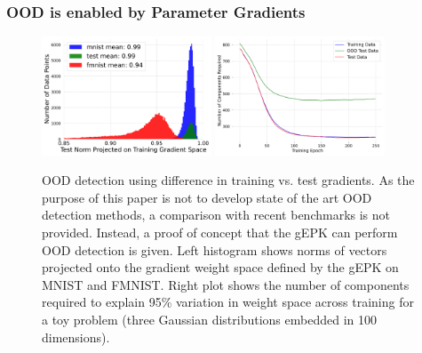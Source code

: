 \begin{frame}
  \frametitle{OOD is enabled by Parameter Gradients}

\begin{figure}[h]
\begin{center}
\includegraphics[width=0.45\textwidth]{c4a_figures/grad_alignment_hist.pdf}
\includegraphics[width=0.45\textwidth]{c4a_figures/ood_noise.pdf}
\end{center}
\caption{OOD detection using difference in training vs. test gradients. As the purpose of this paper is not to develop state of the art OOD detection methods, a comparison with recent benchmarks is not provided. Instead, a proof of concept that the gEPK can perform OOD detection is given. Left histogram shows norms of vectors projected onto the gradient weight space defined by the gEPK on MNIST and FMNIST. Right plot shows the number of components required to explain 95\% variation in weight space across training for a toy problem (three Gaussian distributions embedded in 100 dimensions). }
\label{fig:ood}
\end{figure}
\end{frame}

